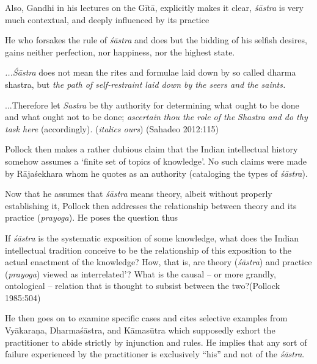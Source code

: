 Also, Gandhi in his lectures on the Gītā, explicitly makes it clear, {\sl śāstra} is very much contextual, and deeply influenced by its practice
\begin{myquote}
He who forsakes the rule of {\sl śāstra} and does but the bidding of his selfish desires, gains neither perfection, nor happiness, nor the highest state.

{\sl ...Śāstra} does not mean the rites and formulae laid down by so called dharma shastra, but {\sl the path of self-restraint laid down by the seers and the saints.}

...Therefore let {\sl Sastra} be thy authority for determining what ought to be done and what ought not to be done; {{\sl ascertain}\relax} {\sl thou the role of the} {{\sl Shastra}\relax} {\sl and do thy task here} (accordingly).
\hfill ({\sl italics ours}) (Sahadeo 2012:115)
\end{myquote}

Pollock then makes a rather dubious claim that the Indian intellectual history somehow assumes a `finite set of topics of knowledge'. No such claims were made by Rājaśekhara whom he quotes as an authority (cataloging the types of {\sl śāstra}).

\newpage

Now that he assumes that {\sl śāstra} means theory, albeit without properly establishing it, Pollock then addresses the relationship between theory and its practice ({\sl prayoga}). He poses the question thus 
\begin{myquote}
If {\sl śāstra} is the systematic exposition of some knowledge, what does the Indian intellectual tradition conceive to be the relationship of this exposition to the actual enactment of the knowledge? How, that is, are theory ({\sl śāstra}) and practice ({\sl prayoga}) viewed as interrelated'? What is the causal -- or more grandly, ontological -- relation that is thought to subsist between the two?\hfill (Pollock 1985:504)
\end{myquote}

He then goes on to examine specific cases and cites selective examples from Vyākaraṇa, Dharmaśāstra, and Kāmasūtra which supposedly exhort the practitioner to abide strictly by injunction and rules. He implies that any sort of failure experienced by the practitioner is exclusively ``his'' and not of the {\sl śāstra}.

